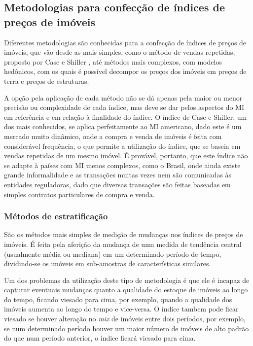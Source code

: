 \documentclass[
	12pt,				%
	oneside,			%
	a4paper,			%
	chapter=TITLE,		%
	section=TITLE,		%
	english,			%
	brazil				%
	]{abntex2}
\begin{document}
\hypertarget{metodologias-para-confecuxe7uxe3o-de-uxedndices-de-preuxe7os-de-imuxf3veis}{%
\subsection{Metodologias para confecção de índices de preços de imóveis}\label{metodologias-para-confecuxe7uxe3o-de-uxedndices-de-preuxe7os-de-imuxf3veis}}

Diferentes metodologias são conhecidas para a confecção de índices de preços de
imóveis, que vão desde as mais simples, como o método de vendas repetidas,
proposto por Case e Shiller \autocite*{repeatedSales}, até métodos mais complexos, com
modelos hedônicos, com os quais é possível decompor os preços dos imóveis em
preços de terra e preços de estruturas.

A opção pela aplicação de cada método não se dá apenas pela maior ou menor
precisão ou complexidade de cada índice, mas deve se dar pelos aspectos do
\gls{MI} em referência e em relação à finalidade do índice. O índice de Case e
Shiller, um dos mais conhecidos, se aplica perfeitamente ao \gls{MI} americano,
dado este é um mercado muito dinâmico, onde a compra e venda de imóveis é feita
com considerável frequência, o que permite a utilização do índice, que se baseia
em vendas repetidas de um mesmo imóvel. É provável, portanto, que este índice
não se adapte à países com \gls{MI} menos complexos, como o Brasil, onde ainda
existe grande informalidade e as transações muitas vezes nem são comunicadas às
entidades reguladoras, dado que diversas transações são feitas baseadas em
simples contratos particulares de compra e venda.

\hypertarget{muxe9todos-de-estratificauxe7uxe3o}{%
\subsubsection{Métodos de estratificação}\label{muxe9todos-de-estratificauxe7uxe3o}}

São os métodos mais simples de medição de mudanças nos índices de preços de
imóveis. É feita pela aferição da mudança de uma medida de tendência central
(usualmente média ou mediana) em um determinado período de tempo, dividindo-se
os imóveis em sub-amostras de características similares.

Um dos problemas da utilização deste tipo de metodologia é que ele é incapaz
de capturar eventuais mudanças quanto a qualidade do estoque de imóveis ao longo
do tempo, ficando viesado para cima, por exemplo, quando a qualidade dos imóveis
aumenta ao longo do tempo e vice-versa. O índice tambem pode ficar viesado se
houver alteração no \emph{mix} de imóveis entre dois períodos, por exemplo, se num
determinado período houver um maior número de imóveis de alto padrão do que
num período anterior, o índice ficará viesado para cima.
\end{document}
